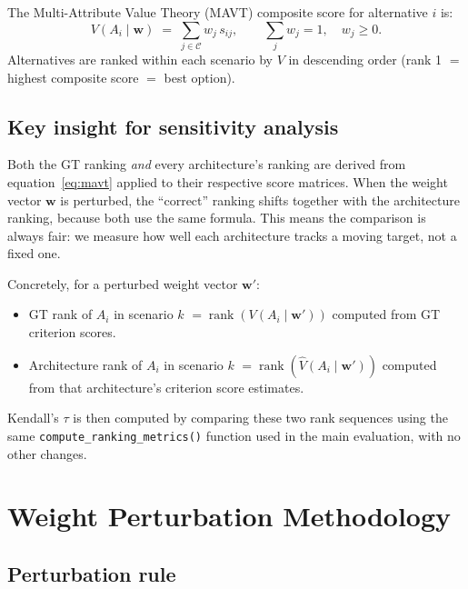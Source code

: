 \documentclass[11pt]{article}
\begin{document}
The Multi-Attribute Value Theory (MAVT) composite score for alternative $i$ is:
\begin{equation}
  V(A_i \mid \mathbf{w})
  \;=\;
  \sum_{j \in \mathcal{C}} w_j \, s_{ij},
  \qquad \sum_{j} w_j = 1, \quad w_j \geq 0.
  \label{eq:mavt}
\end{equation}
Alternatives are ranked within each scenario by $V$ in descending order
(rank 1 $=$ highest composite score $=$ best option).

\subsection{Key insight for sensitivity analysis}

Both the GT ranking \emph{and} every architecture's ranking are derived
from equation~\eqref{eq:mavt} applied to their respective score matrices.
When the weight vector $\mathbf{w}$ is perturbed, the ``correct'' ranking
shifts together with the architecture ranking, because both use the same
formula.  This means the comparison is always fair: we measure how well
each architecture tracks a moving target, not a fixed one.

Concretely, for a perturbed weight vector $\mathbf{w}'$:
\begin{itemize}
  \item GT rank of $A_i$ in scenario $k$
        $= \operatorname{rank}\!\left(V(A_i \mid \mathbf{w}')\right)$
        computed from GT criterion scores.
  \item Architecture rank of $A_i$ in scenario $k$
        $= \operatorname{rank}\!\left(\hat{V}(A_i \mid \mathbf{w}')\right)$
        computed from that architecture's criterion score estimates.
\end{itemize}
Kendall's $\tau$ is then computed by comparing these two rank sequences
using the same \texttt{compute\_ranking\_metrics()} function used in the
main evaluation, with no other changes.

\section{Weight Perturbation Methodology}
\label{sec:perturbation}

\subsection{Perturbation rule}
\end{document}
